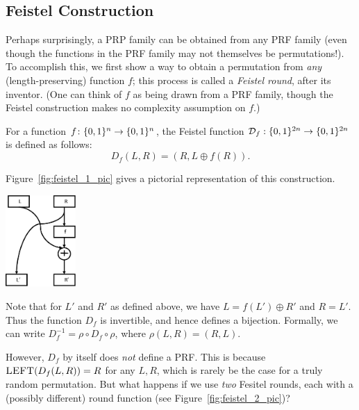 \documentclass[11pt]{article}
\begin{document}
\subsection{Feistel Construction}
\label{sec:feistel-construction}

Perhaps surprisingly, a PRP family can be obtained from any PRF family
(even though the functions in the PRF family may not themselves be
permutations!).  To accomplish this, we first show a way to obtain a
permutation from \emph{any} (length-preserving) function $f$; this
process is called a \emph{Feistel round}, after its inventor.  (One
can think of $f$ as being drawn from a PRF family, though the Feistel
construction makes no complexity assumption on $f$.)

\begin{definition}
  \label{def:feistel-round}
  For a function $f \colon \{0,1\}^{n} \to \{0,1\}^{n}$, the Feistel
  function $\mathcal D_f : \{0,1\}^{2n} \rightarrow \{0,1\}^{2n}$ is defined
  as follows:
  \[ D_f(L, R) = (R,L \oplus f(R) ). \]
\end{definition}

Figure~\ref{fig:feistel_1_pic} gives a pictorial representation of
this construction.

\begin{center}
  \centering
  \includegraphics[width=0.20\textwidth]{feistel1.png}
  \label{fig:feistel_1_pic}
\end{center}

Note that for $L'$ and $R'$ as defined above, we have $L = f(L')
\oplus R'$ and $R = L'$.  Thus the function $D_f$ is invertible, and
hence defines a bijection.  Formally, we can write $D_{f}^{-1} = \rho
\circ D_f \circ \rho$, where $\rho(L,R) = (R,L)$.

However, $D_{f}$ by itself does \emph{not} define a PRF.  This is
because $\textsc{LEFT}( D_f(L,R) ) = R$ for any $L,R$, which is rarely
be the case for a truly random permutation.  But what happens if we
use \emph{two} Fesitel rounds, each with a (possibly different) round
function (see Figure~\ref{fig:feistel_2_pic})?
\end{document}
